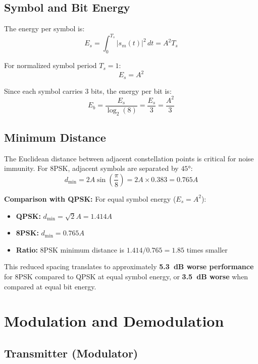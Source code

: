 \subsection{Symbol and Bit Energy}

The energy per symbol is:
\begin{equation}
E_s = \int_0^{T_s} |s_m(t)|^2\,dt = A^2 T_s
\end{equation}

For normalized symbol period $T_s = 1$:
\begin{equation}
E_s = A^2
\end{equation}

Since each symbol carries 3 bits, the energy per bit is:
\begin{equation}
E_b = \frac{E_s}{\log_2(8)} = \frac{E_s}{3} = \frac{A^2}{3}
\end{equation}

\subsection{Minimum Distance}

The Euclidean distance between adjacent constellation points is critical for noise immunity. For 8PSK, adjacent symbols are separated by $45°$:
\begin{equation}
d_{\min} = 2A\sin\left(\frac{\pi}{8}\right) = 2A \times 0.383 = 0.765A
\end{equation}

\textbf{Comparison with QPSK:} For equal symbol energy ($E_s = A^2$):
\begin{itemize}
\item \textbf{QPSK:} $d_{\min} = \sqrt{2}A = 1.414A$
\item \textbf{8PSK:} $d_{\min} = 0.765A$
\item \textbf{Ratio:} 8PSK minimum distance is $1.414/0.765 = 1.85$ times smaller
\end{itemize}

This reduced spacing translates to approximately \textbf{5.3~dB worse performance} for 8PSK compared to QPSK at equal symbol energy, or \textbf{3.5~dB worse} when compared at equal bit energy.

\section{Modulation and Demodulation}

\subsection{Transmitter (Modulator)}

